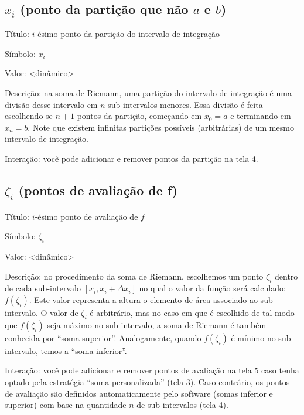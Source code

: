 \documentclass[a4paper,10pt]{scrartcl}
\begin{document}
  
    
  \subsection*{$x_i$ (ponto da partição que não $a$ e $b$)}
    \begin{compactdesc}
      \item{Título:} $i$-ésimo ponto da partição do intervalo de integração
      \item{Símbolo:} $x_i$
      \item{Valor:} <dinâmico>
      \item{Descrição:} na soma de Riemann, uma partição do intervalo de integração é uma divisão desse intervalo em $n$ sub-intervalos menores. Essa divisão é feita escolhendo-se $n+1$ pontos da partição, começando em $x_0 = a$ e terminando em $x_n = b$. Note que existem infinitas partições possíveis (arbitrárias) de um mesmo intervalo de integração.
      \item{Interação:} você pode adicionar e remover pontos da partição na tela 4.
    \end{compactdesc}
    
    \newpage

  \subsection*{$\zeta_i$ (pontos de avaliação de f)}
    \begin{compactdesc}
      \item{Título:} $i$-ésimo ponto de avaliação de $f$
      \item{Símbolo:} $\zeta_i$
      \item{Valor:} <dinâmico>
      \item{Descrição:} no procedimento da soma de Riemann, escolhemos um ponto $\zeta_i$ dentro de cada sub-intervalo $[x_i,x_i + \Delta x_i]$ no qual o valor da função será calculado: $f(\zeta_i)$. Este valor representa a altura o elemento de área associado ao sub-intervalo. O valor de $\zeta_i$ é arbitrário, mas no caso em que é escolhido de tal modo que $f(\zeta_i)$ seja máximo no sub-intervalo, a soma de Riemann é também conhecida por ``soma superior''. Analogamente, quando $f(\zeta_i)$ é mínimo no sub-intervalo, temos a ``soma inferior''.
      \item{Interação:} você pode adicionar e remover pontos de avaliação na tela 5 caso tenha optado pela estratégia ``soma personalizada'' (tela 3). Caso contrário, os pontos de avaliação são definidos automaticamente pelo software (somas inferior e superior) com base na quantidade $n$ de sub-intervalos (tela 4).
    \end{compactdesc}
	
\end{document}
